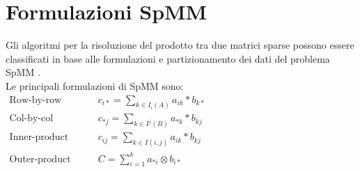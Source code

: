 \section{Formulazioni SpMM}	\label{ChExistingTecqs:formulazioni}
Gli algoritmi per la risoluzione del prodotto tra due matrici sparse possono
essere classificati in base alle formulazioni e partizionamento dei dati del problema SpMM 
.\\ Le principali formulazioni di SpMM sono:
\voidLine
$
\begin{aligned}
\text{Row-by-row}	  &\qquad c_{i*} = \sum\limits_{k \in I_i(A)}  a_{ik} \ast  b_{k*}	\\
\text{Col-by-col}    &\qquad c_{*j} = \sum\limits_{k \in I^j(B)}  a_{*k} \ast  b_{kj}	\\
\text{Inner-product} &\qquad c_{ij} = \sum\limits_{k \in I(i,j)}  a_{ik} \ast  b_{kj}	\\
\text{Outer-product} &\qquad C = \sum\limits_{i=1}^k  a_{*i} \otimes  b_{i*}				\\
\end{aligned}
$
